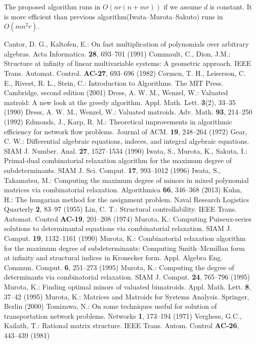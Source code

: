 The proposed algorithm runs in $ O( nr ( n + mr)) $ if we assume $ d $ is constant. 
It is more efficient than previous algorithm(Iwata--Murota--Sakuto\cite{PDCRA}) runs in $ O (mn^2r) $.



\begin{acknowledgements}
\postpone
\end{acknowledgements}


\begin{thebibliography}{99}
 Cantor, D. G., Kaltofen, E.: On fast multiplication of polynomials over arbitrary algebras. Acta Informatica. {\bf 28}, 693--701 (1991)
 Commault, C., Dion, J.M.: Structure at infinity of linear multivariable systems: A geometric approach. IEEE Trans. Automat. Control. {\bf AC-27}, 693--696 (1982)
 Cormen, T. H., Leiserson, C. E., Rivest, R. L., Stein, C.: Introduction to Algorithms. The MIT Press. Cambridge, second edition (2001)
 Dress, A. W. M., Wenzel, W.: Valuated matroid: A new look at the greedy algorithm. Appl. Math. Lett. {\bf 3}(2), 33--35 (1990)
 Dress, A. W. M., Wenzel, W.: Valuated matroids. Adv. Math. {\bf 93}, 214--250 (1992)
 Edmonds, J., Karp, R. M.: Theoretical improvements in algorithmic efficiency for network flow problems. Journal of ACM. {\bf 19}, 248--264 (1972)
 Gear, C. W.: Differential algebraic equations, indeces, and integral algebraic equations. SIAM J. Number. Anal. {\bf 27}, 1527--1534 (1990)
 Iwata, S., Murota, K., Sakuta, I.: Primal-dual combinatorial relaxation algorithm for the maximum degree of subdeterminants. SIAM J. Sci. Comput. {\bf 17}, 993--1012 (1996)
 Iwata, S., Takamatsu, M.: Computing the maximum degree of minors in mixed polynomial matrices via combinatorial relaxation. Algorithmica {\bf 66}, 346--368 (2013)
 Kuhn, H.: The hungarian method for the assignment problem. Naval Research Logistics Quarterly {\bf 2}, 83--97 (1955)
 Lin, C. T.: Structural controllability. IEEE Trans. Automat. Control {\bf AC-19}, 201--208 (1974)
 Murota, K.: Computing Puiseux-series solutions to determinantal equations via combinatorial relaxation. SIAM J. Comput. {\bf 19}, 1132--1161 (1990)
 Murota, K.: Combinatorial relaxation algorithm for the maximum degree of subdeterminants: Computing Smith--Mcmillan form at infinity and structural indices in Kronecker form. Appl. Algebra Eng. Commun. Comput. {\bf 6}, 251--273 (1995)
 Murota, K.: Computing the degree of determinants via combinatorial relaxation. SIAM J. Comput. {\bf 24}, 765--796 (1995)
 Murota, K.: Finding optimal minors of valuated bimatroids. Appl. Math. Lett. {\bf 8}, 37--42 (1995)
 Murota, K.: Matrices and Matroids for Systems Analysis. Springer, Berlin (2000)
 Tomizawa, N.: On some techniques useful for solution of transportation network problems. Networks {\bf 1}, 173--194 (1971)
 Verghese, G.C., Kailath, T.: Rational matrix structure. IEEE Trans. Autom. Control {\bf AC-26}, 443--439 (1981)
\end{thebibliography}
